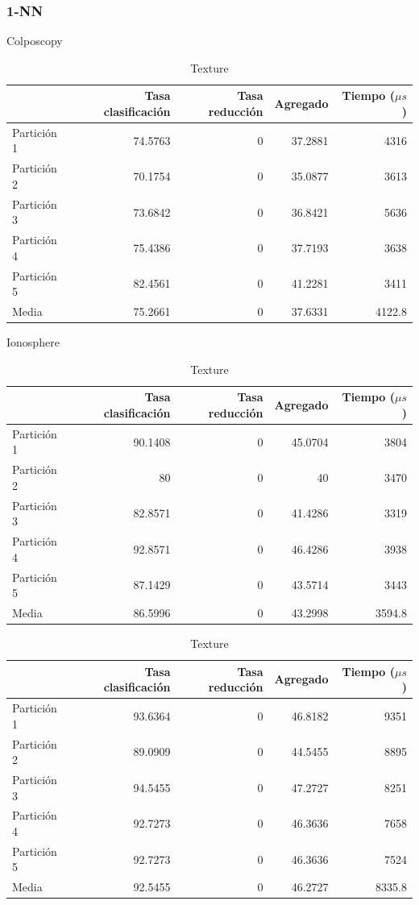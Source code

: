 \documentclass[a4paper, 17pt]{article}
\begin{document}
\subsubsection{1-NN}
\begin{table}[H]
  \centering
  \caption{Colposcopy}
  \begin{tabular}{lrrrr}
    \toprule
    & Tasa clasificación & Tasa reducción & Agregado & Tiempo ($\mu s$)\\ \midrule
    Partición 1 & 74.5763 & 0 & 37.2881 & 4316 \\
    Partición 2 & 70.1754 & 0 & 35.0877 & 3613 \\
    Partición 3 & 73.6842 & 0 & 36.8421 & 5636 \\
    Partición 4 & 75.4386 & 0 & 37.7193 & 3638 \\
    Partición 5 & 82.4561 & 0 & 41.2281 & 3411 \\
    \midrule
    Media & 75.2661 & 0 & 37.6331 & 4122.8 \\
    \bottomrule
  \end{tabular}

  \bigskip
  \caption{Ionosphere}
  \begin{tabular}{lrrrr}
    \toprule
    & Tasa clasificación & Tasa reducción & Agregado & Tiempo ($\mu s$)\\ \midrule
    Partición 1 & 90.1408 & 0 & 45.0704 & 3804 \\
    Partición 2 & 80 & 0 & 40 & 3470 \\
    Partición 3 & 82.8571 & 0 & 41.4286 & 3319 \\
    Partición 4 & 92.8571 & 0 & 46.4286 & 3938 \\
    Partición 5 & 87.1429 & 0 & 43.5714 & 3443 \\
    \midrule
    Media & 86.5996 & 0 & 43.2998 & 3594.8 \\
    \bottomrule
  \end{tabular}

  \bigskip
  \caption{Texture}
  \begin{tabular}{lrrrr}
    \toprule
    & Tasa clasificación & Tasa reducción & Agregado & Tiempo ($\mu s$)\\ \midrule
    Partición 1 & 93.6364 & 0 & 46.8182 & 9351 \\
    Partición 2 & 89.0909 & 0 & 44.5455 & 8895 \\
    Partición 3 & 94.5455 & 0 & 47.2727 & 8251 \\
    Partición 4 & 92.7273 & 0 & 46.3636 & 7658 \\
    Partición 5 & 92.7273 & 0 & 46.3636 & 7524 \\
    \midrule
    Media & 92.5455 & 0 & 46.2727 & 8335.8 \\
    \bottomrule
  \end{tabular}
\end{table}
\end{document}
